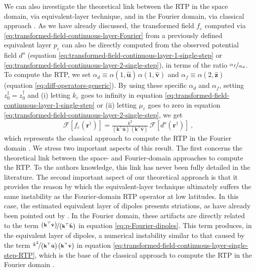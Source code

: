 \documentclass[manuscript,noblind]{geophysics}
\begin{document}
	We can also investigate the theoretical link between the RTP in the space domain, 
	via equivalent-layer technique, and in the Fourier domain, via classical approach \citep[e.g., ][ p. 331]{blakely1996}. 
	As we have already discussed, the transformed field $f_{\varepsilon}$ computed via \ref{eq:transformed-field-continuous-layer-Fourier} 
	from a previously defined equivalent layer $p_{\varepsilon}$ can also be directly 
	computed from the observed potential field $d^{o}$ (equation \ref{eq:transformed-field-continuous-layer-1-single-step}
	or \ref{eq:transformed-field-continuous-layer-2-single-step}), 
	in terms of the ratio $\nicefrac{\alpha_{f}}{\alpha_{d}}$.
	To compute the RTP, we set $\alpha_{d} \equiv \alpha(1, \hat{\mathbf{u}}) \, \alpha(1, \hat{\mathbf{v}})$ 
	and $\alpha_{f} \equiv \alpha(2, \hat{\mathbf{z}})$ (equation \ref{eq:diff-operators-generic}).
	By using these specific $\alpha_{d}$ and $\alpha_{f}$, setting $z^{\ddagger}_{0} = z^{\dagger}_{0}$ and 
	(i) letting $k_{\varepsilon}$ goes to infinity in equation \ref{eq:transformed-field-continuous-layer-1-single-step} or
	(ii) letting $\mu_{\varepsilon}$ goes to zero in equation \ref{eq:transformed-field-continuous-layer-2-single-step}, we get 
	\begin{equation}
		\mathcal{F} [ f_{\varepsilon}(\mathbf{r}^{\dagger}) ] =
		\tfrac{k^{2}}{\left(\mathbf{k}^{\top} \hat{\mathbf{u}} \right) \, \left(\mathbf{k}^{\top} \hat{\mathbf{v}} \right)} \, 
		\mathcal{F} \left[ d^{o}(\mathbf{r}^{\dagger}) \right] \: ,
		\label{eq:transformed-field-continuous-layer-single-step-RTP}
	\end{equation}
	which represents the
	classical approach to compute the RTP in the Fourier domain \citep[e.g., ][ p. 331]{blakely1996}.
	We stress two important aspects of this result. The first concerns the theoretical link 
	between the space- and Fourier-domain approaches to compute the RTP. To the authors knowledge, this link has never been fully 
	detailed in the literature.
	The second important aspect of our theoretical approach is that it provides the 
	reason by which the equivalent-layer technique ultimately suffers the same instability as 
	the Fourier-domain RTP operator at low latitudes. In this case, the estimated equivalent layer of dipoles 
	presents striations, as have already been pointed out by \citet{li_etal2014}. 
	In the Fourier domain, these artifacts are directly related to the term 
	$\nicefrac{\left(\mathbf{k}^{\top} \hat{\mathbf{v}} \right)}{\left(\mathbf{k}^{\top} \hat{\mathbf{h}} \right)}$ 
	in equation \ref{eq:p-Fourier-dipoles}. This term produces, in the equivalent layer of dipoles, a 
	numerical instability similar to that caused by the term 
	$\nicefrac{k^{2}}{\left(\mathbf{k}^{\top} \hat{\mathbf{u}} \right) \, \left(\mathbf{k}^{\top} \hat{\mathbf{v}} \right)}$ in equation 
	\ref{eq:transformed-field-continuous-layer-single-step-RTP},
	which is the base of the classical approach to compute the RTP in the Fourier domain \citep[e.g., ][ p. 331]{blakely1996}.
	
\end{document}
